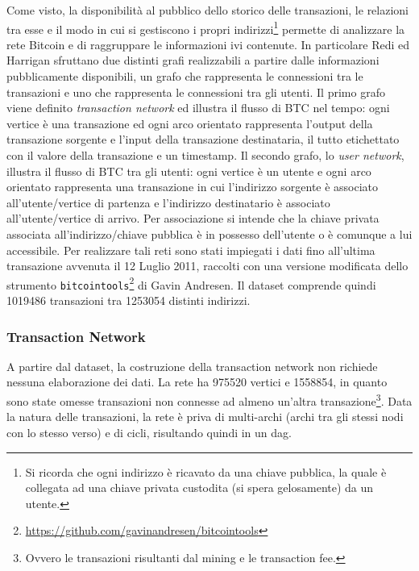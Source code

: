 Come visto, la disponibilità al pubblico dello storico delle transazioni, le relazioni tra esse e il modo in cui si gestiscono i propri indirizzi\footnote{Si ricorda che ogni indirizzo è ricavato da una chiave pubblica, la quale è collegata ad una chiave privata custodita (si spera gelosamente) da un utente.} permette di analizzare la rete Bitcoin e di raggruppare le informazioni ivi contenute.
In particolare Redi ed Harrigan sfruttano due distinti grafi realizzabili a partire dalle informazioni pubblicamente disponibili, un grafo che rappresenta le connessioni tra le transazioni e uno che rappresenta le connessioni tra gli utenti.
Il primo grafo viene definito \emph{transaction network} ed illustra il flusso di BTC nel tempo: ogni vertice è una transazione ed ogni arco orientato rappresenta l'output della transazione sorgente e l'input della transazione destinataria, il tutto etichettato con il valore della transazione e un timestamp.
Il secondo grafo, lo \emph{user network}, illustra il flusso di BTC tra gli utenti: ogni vertice è un utente e ogni arco orientato rappresenta una transazione in cui l'indirizzo sorgente è associato all'utente/vertice di partenza e l'indirizzo destinatario è associato all'utente/vertice di arrivo. Per associazione si intende che la chiave privata associata all'indirizzo/chiave pubblica è in possesso dell'utente o è comunque a lui accessibile.
Per realizzare tali reti sono stati impiegati i dati fino all'ultima transazione avvenuta il 12 Luglio 2011, raccolti con una versione modificata dello strumento \verb|bitcointools|\footnote{\url{https://github.com/gavinandresen/bitcointools} } di Gavin Andresen. Il dataset comprende quindi 1019486 transazioni tra 1253054 distinti indirizzi.

\subsubsection{Transaction Network}

A partire dal dataset, la costruzione della transaction network non richiede nessuna elaborazione dei dati.
La rete ha 975520 vertici e 1558854, in quanto sono state omesse transazioni non connesse ad almeno un'altra transazione\footnote{Ovvero le transazioni risultanti dal mining e le transaction fee.}. Data la natura delle transazioni, la rete è priva di multi-archi (archi tra gli stessi nodi con lo stesso verso) e di cicli, risultando quindi in un \gls{dag}. %


